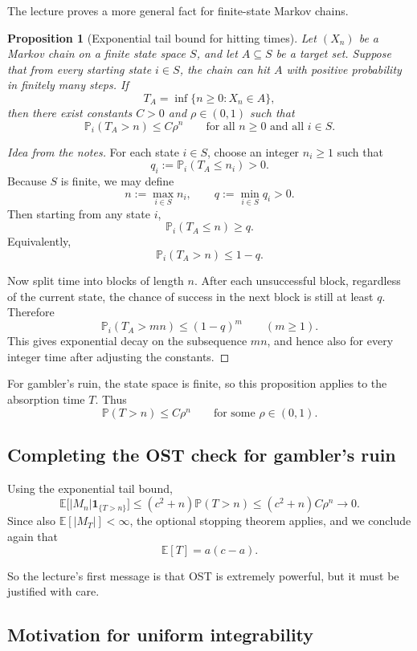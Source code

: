 \documentclass[11pt]{article}
\newtheorem{proposition}[theorem]{Proposition}
\theoremstyle{definition}
\begin{document}
The lecture proves a more general fact for finite-state Markov chains.

\begin{proposition}[Exponential tail bound for hitting times]
Let \((X_n)\) be a Markov chain on a finite state space \(S\), and let \(A\subseteq S\) be a target set. Suppose that from every starting state \(i\in S\), the chain can hit \(A\) with positive probability in finitely many steps. If
\[
T_A=\inf\{n\ge 0:X_n\in A\},
\]
then there exist constants \(C>0\) and \(\rho\in(0,1)\) such that
\[
\mathbb P_i(T_A>n)\le C\rho^n
\qquad \text{for all } n\ge 0 \text{ and all } i\in S.
\]
\end{proposition}

\begin{proof}[Idea from the notes]
For each state \(i\in S\), choose an integer \(n_i\ge 1\) such that
\[
q_i:=\mathbb P_i(T_A\le n_i)>0.
\]
Because \(S\) is finite, we may define
\[
n:=\max_{i\in S} n_i,
\qquad
q:=\min_{i\in S} q_i>0.
\]
Then starting from any state \(i\),
\[
\mathbb P_i(T_A\le n)\ge q.
\]
Equivalently,
\[
\mathbb P_i(T_A>n)\le 1-q.
\]

Now split time into blocks of length \(n\). After each unsuccessful block, regardless of the current state, the chance of success in the next block is still at least \(q\). Therefore
\[
\mathbb P_i(T_A>mn)\le (1-q)^m
\qquad (m\ge 1).
\]
This gives exponential decay on the subsequence \(mn\), and hence also for every integer time after adjusting the constants.
\end{proof}

For gambler's ruin, the state space is finite, so this proposition applies to the absorption time \(T\). Thus
\[
\mathbb P(T>n)\le C\rho^n
\qquad \text{for some } \rho\in(0,1).
\]

\subsection{Completing the OST check for gambler's ruin}

Using the exponential tail bound,
\[
\mathbb E\bigl[|M_n|\mathbf 1_{\{T>n\}}\bigr]
\le
(c^2+n)\mathbb P(T>n)
\le
(c^2+n)C\rho^n
\to 0.
\]
Since also \(\mathbb E[|M_T|]<\infty\), the optional stopping theorem applies, and we conclude again that
\[
\mathbb E[T]=a(c-a).
\]

So the lecture's first message is that OST is extremely powerful, but it must be justified with care.

\subsection{Motivation for uniform integrability}
\end{document}
